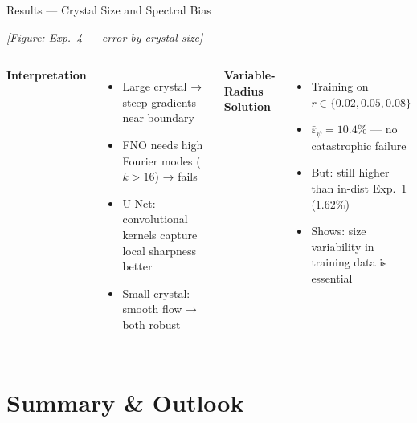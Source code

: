 \documentclass[aspectratio=169, 10pt]{beamer}
\begin{document}
\begin{frame}{Results — Crystal Size and Spectral Bias}
  \begin{center}
    \textit{[Figure: Exp.~4 — error by crystal size]}

  \end{center}

  \vspace{0.3em}
  \begin{columns}[T]
      \textbf{Interpretation}
      \begin{itemize}
        \item Large crystal → steep gradients near boundary
        \item FNO needs high Fourier modes ($k > 16$) → fails
        \item U-Net: convolutional kernels capture local sharpness better
        \item Small crystal: smooth flow → both robust
      \end{itemize}

      \textbf{Variable-Radius Solution}
      \begin{itemize}
        \item Training on $r \in \{0.02, 0.05, 0.08\}$
        \item $\bar{\varepsilon}_\psi = 10.4\%$ — no catastrophic failure
        \item But: still higher than in-dist Exp.~1 ($1.62\%$)
        \item Shows: size variability in training data is essential
      \end{itemize}
  \end{columns}
\end{frame}

\section*{Summary \& Outlook}
\end{document}
